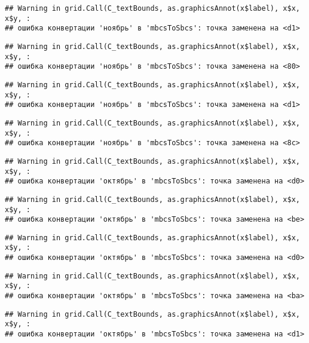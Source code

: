 \documentclass[
]{article}
\begin{document}
\begin{verbatim}
## Warning in grid.Call(C_textBounds, as.graphicsAnnot(x$label), x$x, x$y, :
## ошибка конвертации 'ноябрь' в 'mbcsToSbcs': точка заменена на <d1>
\end{verbatim}

\begin{verbatim}
## Warning in grid.Call(C_textBounds, as.graphicsAnnot(x$label), x$x, x$y, :
## ошибка конвертации 'ноябрь' в 'mbcsToSbcs': точка заменена на <80>
\end{verbatim}

\begin{verbatim}
## Warning in grid.Call(C_textBounds, as.graphicsAnnot(x$label), x$x, x$y, :
## ошибка конвертации 'ноябрь' в 'mbcsToSbcs': точка заменена на <d1>
\end{verbatim}

\begin{verbatim}
## Warning in grid.Call(C_textBounds, as.graphicsAnnot(x$label), x$x, x$y, :
## ошибка конвертации 'ноябрь' в 'mbcsToSbcs': точка заменена на <8c>
\end{verbatim}

\begin{verbatim}
## Warning in grid.Call(C_textBounds, as.graphicsAnnot(x$label), x$x, x$y, :
## ошибка конвертации 'октябрь' в 'mbcsToSbcs': точка заменена на <d0>
\end{verbatim}

\begin{verbatim}
## Warning in grid.Call(C_textBounds, as.graphicsAnnot(x$label), x$x, x$y, :
## ошибка конвертации 'октябрь' в 'mbcsToSbcs': точка заменена на <be>
\end{verbatim}

\begin{verbatim}
## Warning in grid.Call(C_textBounds, as.graphicsAnnot(x$label), x$x, x$y, :
## ошибка конвертации 'октябрь' в 'mbcsToSbcs': точка заменена на <d0>
\end{verbatim}

\begin{verbatim}
## Warning in grid.Call(C_textBounds, as.graphicsAnnot(x$label), x$x, x$y, :
## ошибка конвертации 'октябрь' в 'mbcsToSbcs': точка заменена на <ba>
\end{verbatim}

\begin{verbatim}
## Warning in grid.Call(C_textBounds, as.graphicsAnnot(x$label), x$x, x$y, :
## ошибка конвертации 'октябрь' в 'mbcsToSbcs': точка заменена на <d1>
\end{verbatim}
\end{document}
